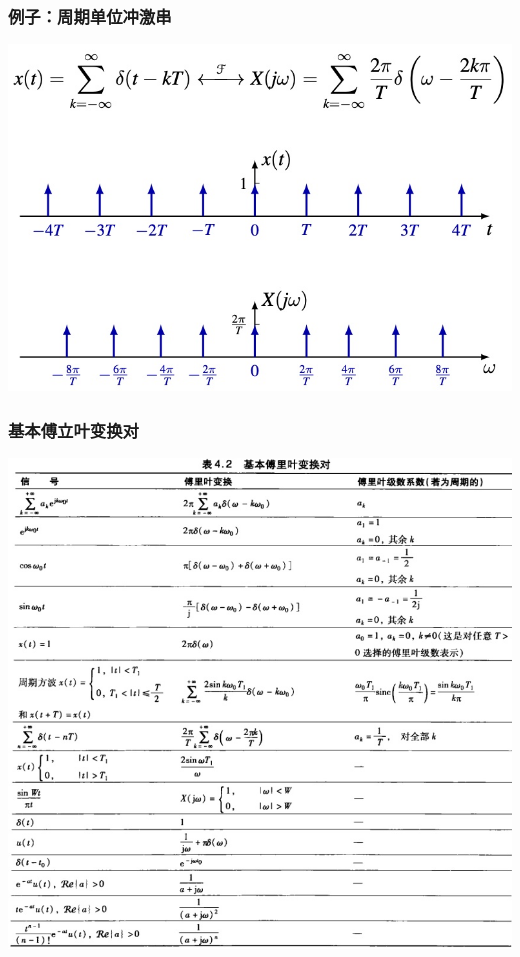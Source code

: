\documentclass[CJKutf8,dvipsnames,table]{beamer}
\begin{document}
\begin{CJK*}{UTF8}{song}
  \begin{frame}
    \frametitle{例子：周期单位冲激串}
    \begin{center}
      \includegraphics[scale=.35]{ftpimpulse}
    \end{center}    
  \end{frame}    
    
  \begin{frame}
    \frametitle{基本傅立叶变换对}
    \begin{center}
      \includegraphics[scale=.29]{ss-c-t4-2}
    \end{center}
  \end{frame} 
    

\end{CJK*}
\end{document}

